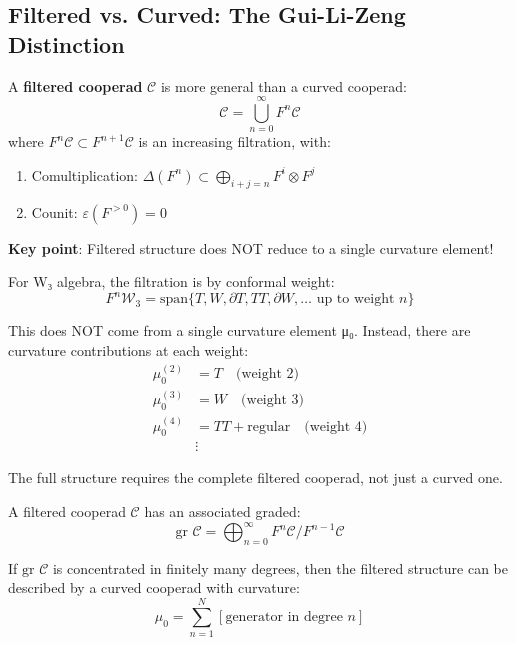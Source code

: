 \subsection{Filtered vs. Curved: The Gui-Li-Zeng Distinction}
\label{sec:filtered-vs-curved}

\begin{theorem}
\label{thm:filtered-cooperads}
A \textbf{filtered cooperad} $\mathcal{C}$ is more general than a curved cooperad:
\begin{equation}
\mathcal{C} = \bigcup_{n=0}^\infty F^n \mathcal{C}
\end{equation}
where $F^n \mathcal{C} \subset F^{n+1} \mathcal{C}$ is an increasing filtration, with:
\begin{enumerate}
\item Comultiplication: $\Delta(F^n) \subset \bigoplus_{i+j=n} F^i \otimes F^j$
\item Counit: $\varepsilon(F^{>0}) = 0$
\end{enumerate}

\textbf{Key point}: Filtered structure does NOT reduce to a single curvature element!
\end{theorem}

\begin{example}
\label{ex:w-algebra-filtered-comprehensive}
For W₃ algebra, the filtration is by conformal weight:
\begin{equation}
F^n \mathcal{W}_3 = \text{span}\{T, W, \partial T, TT, \partial W, \ldots \text{ up to 
weight } n\}
\end{equation}

This does NOT come from a single curvature element μ₀. Instead, there are curvature 
contributions at each weight:
\begin{align}
\mu_0^{(2)} &= T \quad \text{(weight 2)}\\
\mu_0^{(3)} &= W \quad \text{(weight 3)}\\
\mu_0^{(4)} &= TT + \text{regular} \quad \text{(weight 4)}\\
&\vdots
\end{align}

The full structure requires the complete filtered cooperad, not just a curved one.
\end{example}

\begin{theorem}
\label{thm:filtered-to-curved}
A filtered cooperad $\mathcal{C}$ has an associated graded:
\begin{equation}
\text{gr } \mathcal{C} = \bigoplus_{n=0}^\infty F^n \mathcal{C} / F^{n-1} \mathcal{C}
\end{equation}

If $\text{gr } \mathcal{C}$ is concentrated in finitely many degrees, then the filtered 
structure can be described by a curved cooperad with curvature:
\begin{equation}
\mu_0 = \sum_{n=1}^N [\text{generator in degree } n]
\end{equation}
\end{theorem}

